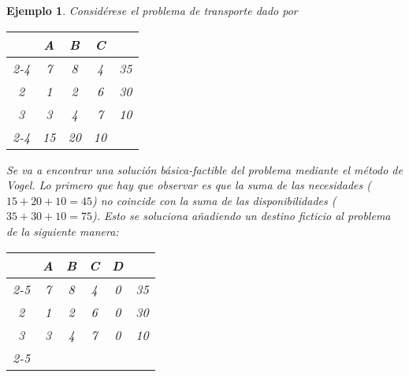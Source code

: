 \documentclass[11pt]{report}
\theoremstyle{mytheorem}
\theoremstyle{mydefinition}
\theoremstyle{myexample}
\newtheorem*{example}{Ejemplo}
\begin{document}
\begin{example}
Considérese el problema de transporte dado por
\begin{center}
\setlength\extrarowheight{2pt}
\begin{tabular}{ccccc}
    \multicolumn{1}{c}{} & \multicolumn{1}{c}{A} &  \multicolumn{1}{c}{B} &  \multicolumn{1}{c}{C} &  \multicolumn{1}{c}{} \\ \cline{2-4}

    \multicolumn{1}{c|}{1} & \multicolumn{1}{c}{7} & \multicolumn{1}{c}{8} & \multicolumn{1}{c|}{4} & \multicolumn{1}{c}{35} \\

    \multicolumn{1}{c|}{2} & \multicolumn{1}{c}{1} & \multicolumn{1}{c}{2} & \multicolumn{1}{c|}{6} & \multicolumn{1}{c}{30} \\

    \multicolumn{1}{c|}{3} & \multicolumn{1}{c}{3} & \multicolumn{1}{c}{4} & \multicolumn{1}{c|}{7} & \multicolumn{1}{c}{10} \\[2pt] \cline{2-4}

    \multicolumn{1}{c}{} & \multicolumn{1}{c}{15} & \multicolumn{1}{c}{20} & \multicolumn{1}{c}{10} & \multicolumn{1}{c}{}
\end{tabular}
\end{center}
Se va a encontrar una solución básica-factible del problema mediante el método de Vogel. Lo primero que hay que observar es que la suma de las necesidades ($15+20+10=45$) no coincide con la suma de las disponibilidades ($35+30+10=75$). Esto se soluciona añadiendo un destino ficticio al problema de la siguiente manera:
\begin{center}
\setlength\extrarowheight{2pt}
\begin{tabular}{cccccc}
    \multicolumn{1}{c}{} & \multicolumn{1}{c}{A} &  \multicolumn{1}{c}{B} &  \multicolumn{1}{c}{C} &  \multicolumn{1}{c}{D} & \multicolumn{1}{c}{} \\ \cline{2-5}

    \multicolumn{1}{c|}{1} & \multicolumn{1}{c}{7} & \multicolumn{1}{c}{8} & \multicolumn{1}{c}{4} & \multicolumn{1}{c|}{0} & \multicolumn{1}{c}{35} \\

    \multicolumn{1}{c|}{2} & \multicolumn{1}{c}{1} & \multicolumn{1}{c}{2} & \multicolumn{1}{c}{6} & \multicolumn{1}{c|}{0} & \multicolumn{1}{c}{30} \\

    \multicolumn{1}{c|}{3} & \multicolumn{1}{c}{3} & \multicolumn{1}{c}{4} & \multicolumn{1}{c}{7} & \multicolumn{1}{c|}{0} & \multicolumn{1}{c}{10} \\[2pt] \cline{2-5}


\end{tabular}
\end{center}
\end{example}
\end{document}
